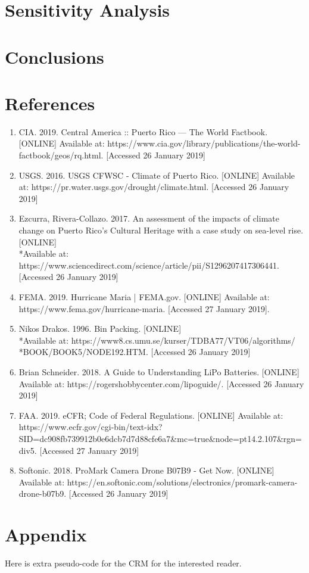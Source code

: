 \documentclass[a4paper,12pt]{article}
\begin{document}
\newpage

\section{Sensitivity Analysis}

\newpage

\section{Conclusions}

\newpage

\section{References}

\begin{enumerate}
\item CIA. 2019. Central America :: Puerto Rico — The World Factbook. [ONLINE] Available at: https://www.cia.gov/library/publications/the-world-factbook/geos/rq.html. [Accessed 26 January 2019]
\item USGS. 2016. USGS CFWSC - Climate of Puerto Rico. [ONLINE] Available at: https://pr.water.usgs.gov/drought/climate.html. [Accessed 26 January 2019]
\item Ezcurra, Rivera-Collazo. 2017. An assessment of the impacts of climate change on Puerto Rico's Cultural Heritage with a case study on sea-level rise. [ONLINE] \\*Available at: https://www.sciencedirect.com/science/article/pii/S1296207417306441. [Accessed 26 January 2019]
\item FEMA. 2019. Hurricane Maria | FEMA.gov. [ONLINE] Available at: https://www.fema.gov/hurricane-maria. [Accessed 27 January 2019].
\item Nikos Drakos. 1996. Bin Packing. [ONLINE] \\*Available at: https://www8.cs.umu.se/kurser/TDBA77/VT06/algorithms/\\*BOOK/BOOK5/NODE192.HTM. [Accessed 26 January 2019]
\item Brian Schneider. 2018. A Guide to Understanding LiPo Batteries. [ONLINE] Available at: https://rogershobbycenter.com/lipoguide/. [Accessed 26 January 2019]
\item FAA. 2019. eCFR; Code of Federal Regulations. [ONLINE] Available at: https://www.ecfr.gov/cgi-bin/text-idx?SID=dc908fb739912b0e6dcb7d7d88cfe6a7\&mc=true\&node=pt14.2.107\&rgn=div5. [Accessed 27 January 2019]
\item Softonic. 2018. ProMark Camera Drone B07B9 - Get Now. [ONLINE] Available at: https://en.softonic.com/solutions/electronics/promark-camera-drone-b07b9. [Accessed 26 January 2019]
\end{enumerate}

\section{Appendix}
Here is extra pseudo-code for the CRM for the interested reader.
\end{document}
